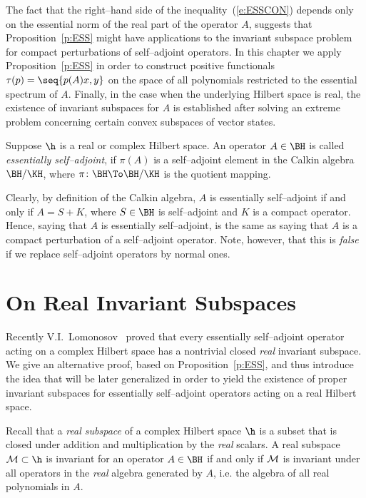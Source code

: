 \smallskip

The fact that the right--hand side of the
inequality~(\ref{e:ESSCON}) depends only on the essential norm
of the real part of the operator $A$, suggests that
Proposition~\ref{p:ESS} might have applications to the
invariant subspace problem for compact perturbations of
self--adjoint operators. In this chapter we apply
Proposition~\ref{p:ESS} in order to construct positive
functionals $\tau(p)=\seq{p(A)x,y}$ on the space of all
polynomials restricted to the essential spectrum of $A$.
Finally, in the case when the underlying Hilbert space is real,
the existence of invariant subspaces for $A$ is established
after solving an extreme problem concerning certain convex
subspaces of vector states.

\begin{defn}
Suppose $\h$ is a real or complex Hilbert space. An operator
$A\in\BH$ is called \emph{essentially self--adjoint}, if
$\pi(A)$ is a self--adjoint element in the Calkin algebra
$\BH/\KH$, where $\pi\colon\BH\To\BH/\KH$ is the quotient
mapping.
\end{defn}

\begin{rem}
Clearly, by definition of the Calkin algebra, $A$ is
essentially self--adjoint if and only if $A=S+K$, where
$S\in\BH$ is self--adjoint and $K$ is a compact operator.
Hence, saying that $A$ is essentially self--adjoint, is the
same as saying that $A$ is a compact perturbation of a
self--adjoint operator. Note, however, that this is
{\em{}false} if we replace self--adjoint operators by normal
ones.
\end{rem}

\goodbreak
\section{On Real Invariant Subspaces}

Recently V.I.~Lomonosov~\cite{Lom92} proved that every
essentially self--adjoint operator acting on a complex Hilbert
space has a nontrivial closed \emph{real} invariant subspace.
We give an alternative proof, based on Proposition~\ref{p:ESS},
and thus introduce the idea that will be later generalized in
order to yield the existence of proper invariant subspaces for
essentially self--adjoint operators acting on a real Hilbert
space.

Recall that a \emph{real subspace} of a complex Hilbert space
$\h$ is a subset that is closed under addition and
multiplication by the \emph{real} scalars. A real subspace
$\cal{M}\subset\h$ is invariant for an operator $A\in\BH$ if
and only if $\cal{M}$ is invariant under all operators in the
\emph{real} algebra generated by $A$, i.e. the algebra of all
real polynomials in $A$.

